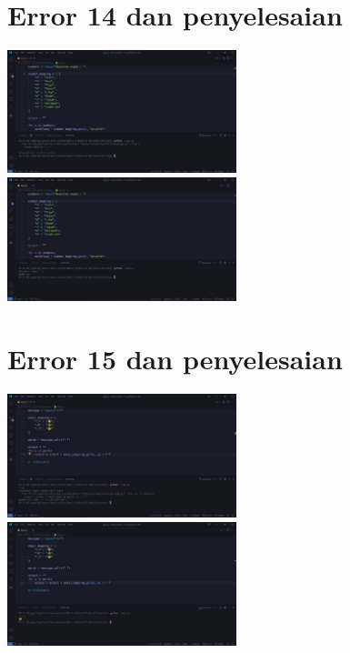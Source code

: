 \documentclass{article}
\begin{document}
\section{Error 14 dan penyelesaian}
\includegraphics[width=0.5\textwidth]{gambar/24_error.png}
\includegraphics[width=0.5\textwidth]{gambar/24_penanganan.png}

\section{Error 15 dan penyelesaian}
\includegraphics[width=0.5\textwidth]{gambar/25_error.png}
\includegraphics[width=0.5\textwidth]{gambar/25_pengananan.png}
\end{document}
